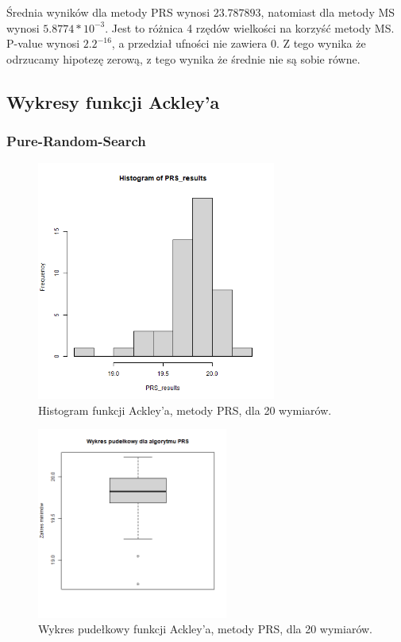 \documentclass{lab}
\begin{document}
Średnia wyników dla metody PRS wynosi $23.787893$, natomiast dla metody MS wynosi $5.8774*10^{-3}$. Jest to różnica 4 rzędów wielkości na korzyść metody MS. P-value wynosi $2.2^{-16}$, a przedział ufności nie zawiera 0. Z tego wynika że odrzucamy hipotezę zerową, z tego wynika że średnie nie są sobie równe.

\subsection{Wykresy funkcji Ackley’a}
\subsubsection{Pure-Random-Search}
\begin{figure}[H]
  \centering
  \includegraphics[width=0.7\textwidth]{img/dim20_PRS_Ackley_his.png}
  \caption{Histogram funkcji Ackley'a, metody PRS, dla 20 wymiarów.}
\end{figure}
\begin{figure}[H]
  \centering
  \includegraphics[width=0.56\textwidth]{img/dim20_PRS_Ackley.png}
  \caption{Wykres pudełkowy funkcji Ackley'a, metody PRS, dla 20 wymiarów.}
\end{figure}
\end{document}
